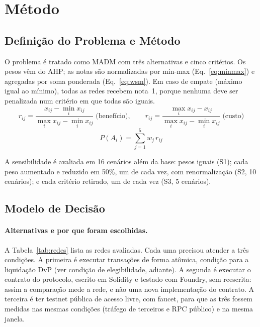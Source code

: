 \documentclass[10pt,a4paper]{article}
\begin{document}
\section{Método}\label{sec:metodo}

\subsection{Definição do Problema e Método}

O problema é tratado como MADM com três alternativas e cinco critérios. Os pesos vêm do AHP; as notas são normalizadas por min-max (Eq.~\ref{eq:minmax}) e agregadas por soma ponderada (Eq.~\ref{eq:wsm}). Em caso de empate (máximo igual ao mínimo), todas as redes recebem nota~1, porque nenhuma deve ser penalizada num critério em que todas são iguais.
\begin{equation}\label{eq:minmax}
r_{ij} = \frac{x_{ij} - \min_i x_{ij}}{\max_i x_{ij} - \min_i x_{ij}} \;\text{(benefício)}, \qquad
r_{ij} = \frac{\max_i x_{ij} - x_{ij}}{\max_i x_{ij} - \min_i x_{ij}} \;\text{(custo)}
\end{equation}
\begin{equation}\label{eq:wsm}
P(A_i) = \sum_{j=1}^{5} w_j \, r_{ij}
\end{equation}

A sensibilidade é avaliada em 16 cenários além da base: pesos iguais (S1); cada peso aumentado e reduzido em 50\%, um de cada vez, com renormalização (S2, 10 cenários); e cada critério retirado, um de cada vez (S3, 5 cenários).

\subsection{Modelo de Decisão}

\paragraph{Alternativas e por que foram escolhidas.} A Tabela~\ref{tab:redes} lista as redes avaliadas. Cada uma precisou atender a três condições. A primeira é executar transações de forma atômica, condição para a liquidação DvP (ver condição de elegibilidade, adiante). A segunda é executar o contrato do protocolo, escrito em Solidity e testado com Foundry, sem reescrita: assim a comparação mede a rede, e não uma nova implementação do contrato. A terceira é ter testnet pública de acesso livre, com faucet, para que as três fossem medidas nas mesmas condições (tráfego de terceiros e RPC público) e na mesma janela.
\end{document}
